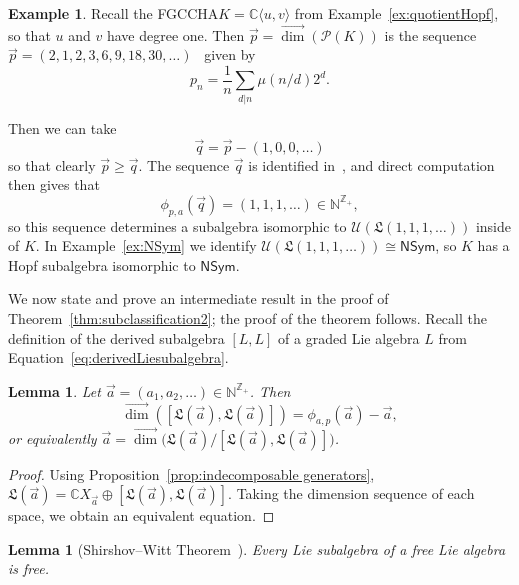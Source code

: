 \documentclass[11pt]{amsart}
\newtheorem{lemma}[theorem]{Lemma}
\theoremstyle{definition}
\newtheorem{example}[theorem]{Example}
\numberwithin{equation}{section}
\def\NN{{\mathbb N}}
\def\CC{{\mathbb C}}
\def\ZZ{{\mathbb Z}}
\newcommand{\FGCCHA}{\textsf{FGCCHA}\xspace}
\newcommand{\vecdim}{\overrightarrow{\dim}}
\begin{document}
\begin{example}
\label{ex:NSymInCxy}
Recall the \FGCCHA $K = \CC\langle u, v \rangle$ from Example~\ref{ex:quotientHopf}, so that $u$ and $v$ have degree one.  Then $\vec{p} = \vecdim(\mathcal{P}(K))$ is the sequence
$\vec{p} = (2, 1, 2, 3, 6, 9, 18, 30,\ldots)$~\cite[\href{https://oeis.org/A001037}{A001037}]{OEIS} given by 
\[
p_{n} = \frac{1}{n} \sum_{d | n} \mu(n/d) 2^{d}.
\]

Then we can take 
\[
\vec{q} = \vec{p} - (1, 0, 0, \ldots)
\]
so that clearly $\vec{p} \ge \vec{q}$.  
The sequence $\vec{q}$ is identified in~\cite[\href{https://oeis.org/A059966}{A059966}]{OEIS}, and direct computation then gives that
\[
\phi_{p, a}(\vec{q}) = (1, 1, 1, \ldots) \in \NN^{\ZZ_{+}},
\]
so this sequence determines a subalgebra isomorphic to $\mathcal{U}(\mathfrak{L}(1, 1, 1, \ldots))$ inside of $K$.   
In Example~\ref{ex:NSym} we identify $\mathcal{U}(\mathfrak{L}(1, 1, 1, \ldots)) \cong \mathsf{NSym}$, so $K$ has a Hopf subalgebra isomorphic to $\mathsf{NSym}$.
\end{example}

We now state and prove an intermediate result in the proof of Theorem~\ref{thm:subclassification2}; the proof of the theorem follows.  Recall the definition of the derived subalgebra $[L, L]$ of a graded Lie algebra $L$ from Equation~\eqref{eq:derivedLiesubalgebra}.

\begin{lemma}
\label{lem:deriveddimension}
Let $\vec{a} = (a_{1}, a_{2}, \ldots) \in \NN^{\ZZ_{+}}$.  Then
\[
\vecdim([\mathfrak{L}(\vec{a}), \mathfrak{L}(\vec{a})]) = \phi_{a, p}(\vec{a}) - \vec{a},
\]
or equivalently $\vec{a} = \vecdim\big(\mathfrak{L}(\vec{a})\big/ [\mathfrak{L}(\vec{a}), \mathfrak{L}(\vec{a})]\big)$.
\end{lemma}
\begin{proof}
Using Proposition~\ref{prop:indecomposable generators}, $ \mathfrak{L}(\vec{a}) = \CC X_{\vec{a}} \oplus [\mathfrak{L}(\vec{a}), \mathfrak{L}(\vec{a})]$.  Taking the dimension sequence of each space, we obtain an equivalent equation.
\end{proof}

\begin{lemma}[Shirshov--Witt Theorem~\cite{S09, Witt56}]
\label{lem:ShiWitt}
Every Lie subalgebra of a free Lie algebra is free.
\end{lemma}
\end{document}

